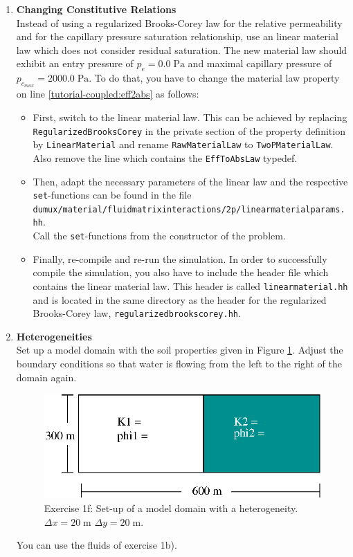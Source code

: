 \begin{enumerate}
\item \textbf{Changing Constitutive Relations} \\
  Instead of using a regularized Brooks-Corey law for the relative
  permeability and for the capillary pressure saturation relationship,
  use an linear material law which does not consider residual
  saturation. The new material law should exhibit an entry pressure of
  $p_e = 0.0\;\text{Pa}$ and maximal capillary pressure of
  $p_{c_{max}} = 2000.0\;\text{Pa}$. To do that, you have to change
  the material law property on line
  \ref{tutorial-coupled:eff2abs} as follows:
\begin{itemize}
\item First, switch to the linear material law. This can be achieved
  by replacing \texttt{RegularizedBrooksCorey} in the private section
  of the property definition by \texttt{LinearMaterial} and rename
  \texttt{RawMaterialLaw} to \texttt{TwoPMaterialLaw}. Also remove the
  line which contains the \texttt{EffToAbsLaw} typedef.
\item Then, adapt the necessary parameters of the linear law and the
  respective \texttt{set}-functions can be found in the file
  \texttt{dumux/material/fluidmatrixinteractions/2p/linearmaterialparams.hh}.\\
  Call the \texttt{set}-functions from the constructor of the problem.
\item Finally, re-compile and re-run the simulation. In order to
  successfully compile the simulation, you also have to include the
  header file which contains the linear material law. This header is
  called \texttt{linearmaterial.hh} and is located in the same
  directory as the header for the regularized Brooks-Corey law,
  \texttt{regularizedbrookscorey.hh}.
\end{itemize}
 
\item \textbf{Heterogeneities}  \\
  Set up a model domain with the soil properties given in Figure
  \ref{tutorial-coupled:exercise1_d}. Adjust the boundary conditions
  so that water is flowing from the left to the right of the domain again.
\begin{figure}[ht]
\centering
\includegraphics[width=0.5\linewidth,keepaspectratio]{EPS/exercise1_c.eps}
\caption{Exercise 1f: Set-up of a model domain with a heterogeneity. $\Delta x = 20 \;\text{m}$ $\Delta y = 20\;\text{m}$.}\label{tutorial-coupled:exercise1_d}
\end{figure}
You can use the fluids of exercise 1b).


\end{enumerate}
